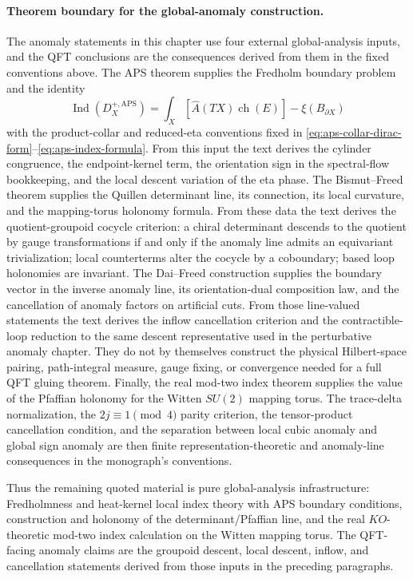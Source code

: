 \paragraph{Theorem boundary for the global-anomaly construction.}
The anomaly statements in this chapter use four external global-analysis
inputs, and the QFT conclusions are the consequences derived from them in the
fixed conventions above.  The APS theorem supplies the Fredholm boundary
problem and the identity
\[
  \operatorname{Ind}(D_X^{+,\mathrm{APS}})
  =
  \int_X[\widehat A(TX)\operatorname{ch}(E)]-\xi(B_{\partial X})
\]
with the product-collar and reduced-eta conventions fixed in
\eqref{eq:aps-collar-dirac-form}--\eqref{eq:aps-index-formula}.  From this
input the text derives the cylinder congruence, the endpoint-kernel term, the
orientation sign in the spectral-flow bookkeeping, and the local descent
variation of the eta phase.  The Bismut--Freed theorem supplies the Quillen
determinant line, its connection, its local curvature, and the mapping-torus
holonomy formula.  From these data the text derives the quotient-groupoid
cocycle criterion: a chiral determinant descends to the quotient by gauge
transformations if and only if the anomaly line admits an equivariant
trivialization; local counterterms alter the cocycle by a coboundary; based
loop holonomies are invariant.  The Dai--Freed construction supplies the
boundary vector in the inverse anomaly line, its orientation-dual composition
law, and the cancellation of anomaly factors on artificial cuts.  From those
line-valued statements the text derives the inflow cancellation criterion and
the contractible-loop reduction to the same descent representative used in
the perturbative anomaly chapter.  They do not by themselves construct the
physical Hilbert-space pairing, path-integral measure, gauge fixing, or
convergence needed for a full QFT gluing theorem.  Finally, the real mod-two
index theorem
supplies the value of the Pfaffian holonomy for the Witten \(SU(2)\)
mapping torus.  The trace-delta normalization, the \(2j\equiv1\pmod4\)
parity criterion, the tensor-product cancellation condition, and the
separation between local cubic anomaly and global sign anomaly are then
finite representation-theoretic and anomaly-line consequences in the
monograph's conventions.

Thus the remaining quoted material is pure global-analysis infrastructure:
Fredholmness and heat-kernel local index theory with APS boundary
conditions, construction and holonomy of the determinant/Pfaffian line, and
the real \(KO\)-theoretic mod-two index calculation on the Witten mapping
torus.  The QFT-facing anomaly claims are the groupoid descent, local
descent, inflow, and cancellation statements derived from those inputs in the
preceding paragraphs.

